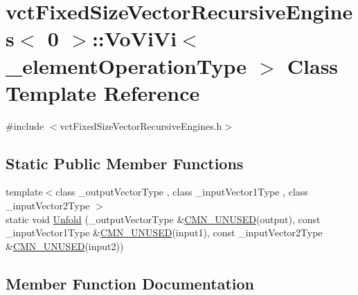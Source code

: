 \hypertarget{classvct_fixed_size_vector_recursive_engines_3_010_01_4_1_1_vo_vi_vi}{}\section{vct\+Fixed\+Size\+Vector\+Recursive\+Engines$<$ 0 $>$\+:\+:Vo\+Vi\+Vi$<$ \+\_\+element\+Operation\+Type $>$ Class Template Reference}
\label{classvct_fixed_size_vector_recursive_engines_3_010_01_4_1_1_vo_vi_vi}


{\ttfamily \#include $<$vct\+Fixed\+Size\+Vector\+Recursive\+Engines.\+h$>$}

\subsection*{Static Public Member Functions}
\begin{DoxyCompactItemize}
\item 
{\footnotesize template$<$class \+\_\+output\+Vector\+Type , class \+\_\+input\+Vector1\+Type , class \+\_\+input\+Vector2\+Type $>$ }\\static void \hyperlink{classvct_fixed_size_vector_recursive_engines_3_010_01_4_1_1_vo_vi_vi_ab1b565a8e435a1c3f3fbfe07d1396ff4}{Unfold} (\+\_\+output\+Vector\+Type \&\hyperlink{cmn_portability_8h_a021894e2626935fa2305434b1e893ff6}{C\+M\+N\+\_\+\+U\+N\+U\+S\+E\+D}(output), const \+\_\+input\+Vector1\+Type \&\hyperlink{cmn_portability_8h_a021894e2626935fa2305434b1e893ff6}{C\+M\+N\+\_\+\+U\+N\+U\+S\+E\+D}(input1), const \+\_\+input\+Vector2\+Type \&\hyperlink{cmn_portability_8h_a021894e2626935fa2305434b1e893ff6}{C\+M\+N\+\_\+\+U\+N\+U\+S\+E\+D}(input2))
\end{DoxyCompactItemize}


\subsection{Member Function Documentation}
\hypertarget{classvct_fixed_size_vector_recursive_engines_3_010_01_4_1_1_vo_vi_vi_ab1b565a8e435a1c3f3fbfe07d1396ff4}{}
